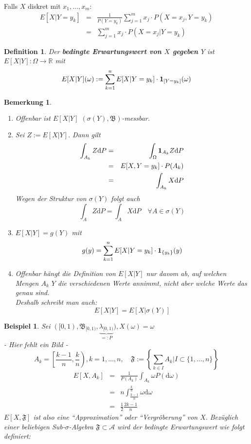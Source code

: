 \documentclass[a4paper,11pt]{scrbook}
\newcommand{\R}{{\mathbb R}}
\newcommand{\ind}{\text{\bf{1}}}
\def\AA{ \mathcal{A} }
\def\FF{ \mathfrak{F} }
\def\BB{ \mathfrak{B} }
\def\d{\mbox{d}}
\newtheorem*{DefON}{Definition}
\newtheorem{Bsp}{Beispiel}[chapter]
\newtheorem*{BemON}{Bemerkung}
\theoremstyle{nonumberplain}
\begin{document}
Falls $X$ diskret mit $x_1, \ldots, x_m$:
\begin{eqnarray*}
E[X|Y=y_k] &=& \frac 1 {P(Y=y_k)} \sum_{j=1}^m x_j\cdot P(X=x_j, Y=y_k)\\
&=& \sum_{j=1}^m x_j\cdot P(X=x_j|Y=y_k)
\end{eqnarray*}

\begin{DefON} Der \textbf{bedingte Erwartungswert von $X$ gegeben $Y$}  ist $E[X|Y]:\Omega\to\R$ mit 
$$E[X|Y](\omega):=\sum_{k=1}^n E[X|Y=y_k]\cdot \ind_{[Y=y_k]}(\omega)$$
\end{DefON}

\begin{BemON}\begin{enumerate}
\item[a)] Offenbar ist $E[X|Y]$ $(\sigma(Y),\BB)$-messbar.
\item[b)] Sei $Z:=E[X|Y].$ Dann gilt
\begin{eqnarray*}
\int_{A_k} Z\d P &=& \int_\Omega \ind_{A_k} Z\d P\\
&=&E[X,Y=y_k]\cdot P(A_k)\\
&=& \int_{A_k}X\d P
\end{eqnarray*}
Wegen der Struktur von $\sigma(Y)$ folgt auch
$$\int_A Z\d P = \int_{A}X\d P\quad\forall A\in\sigma(Y)$$
\item[c)] $E[X|Y] = g(Y)$ mit
$$g(y)=\sum_{k=1}^n E[X|Y=y_k]\cdot\ind_{\{y_k\}}(y)$$
\item[d)] Offenbar hängt die Definition von $E[X|Y]$ nur davom ab, auf welchen Mengen $A_k$ $Y$ die verschiedenen Werte annimmt, nicht aber welche Werte das genau sind.\\
Deshalb schreibt man auch:
$$E[X|Y]=E[X|\sigma(Y)]$$
\end{enumerate}
\end{BemON}

\begin{Bsp}\label{Bsp7.1} Sei $([0,1), \BB_{[0,1)}, \underbrace{\lambda_{[0,1)}}_{=:P}), X(\omega) = \omega$\\
- Hier fehlt ein Bild -\\
$$A_k=\left[\frac {k-1} n\right., \left.\frac k n\right), k = 1, \ldots, n,\quad \FF:=\left\{\sum_{k\in I} A_k| I\subset\{1,\ldots, n\}\right\}$$
\begin{eqnarray*}
E[X, A_k] &=& \frac 1 {P(A_k)} \int_{A_k}\omega P(\d\omega)\\
&=& n\int_{\frac {k-1} n}^{\frac k n} \omega\d\omega\\
&=& \frac 1 2 \frac {2k-1} n
\end{eqnarray*}
$E[X, \FF]$ ist also eine "`Approximation"' oder "`Vergröberung"' von $X.$ Bezüglich einer beliebigen Sub-$\sigma$-Algebra $\FF\subset\AA$ wird der bedingte Erwartungswert wie folgt definiert:
\end{Bsp}
\end{document}
